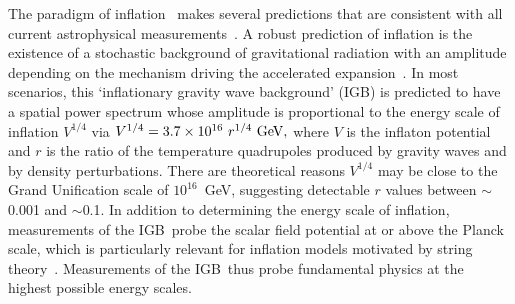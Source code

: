 \documentclass[12pt]{article}
\def\igb{IGB}
\def\pb{\sc polarbear}
\def\ebexsk{EBEX-IDS}
\begin{document}
The paradigm of inflation~\cite{guth81,linde82,albrecht82,sato81,kolb94}
makes several predictions that are consistent with all current astrophysical 
measurements~\cite{spergel06,Tegmark:2006az,planck2015parameters,planck2015inflation}. 
A robust prediction of inflation is the existence of a stochastic background of gravitational radiation 
with an amplitude depending on the mechanism driving the accelerated 
expansion~\cite{starobinsky82,starobinsky83a,rubakov82,grishchuk75,abbott84a}.
In most scenarios, this `inflationary gravity wave background' (\igb) is predicted
to have a spatial power spectrum whose amplitude is proportional to the energy
scale of inflation $V^{1/4}$ via
$V^{1/4} = 3.7 \times 10^{16} \ r^{1/4}\,\, {\rm GeV},$
where $V$ is the inflaton potential and $r$ is the ratio of the temperature
quadrupoles produced by gravity waves and by density perturbations.  
There are theoretical reasons $V^{1/4}$ may be close to the Grand
Unification scale of $10^{16}$~GeV, suggesting detectable $r$ values between 
$\sim$0.001 and $\sim$0.1. In addition to determining the energy scale of inflation, measurements 
of the \igb\ probe the scalar field potential at or above the Planck scale, which is particularly relevant for inflation models motivated 
by string theory~\cite{SnowmassInflationTheory}. Measurements of the \igb\ thus probe fundamental physics at the 
highest possible energy scales. 
\end{document}
